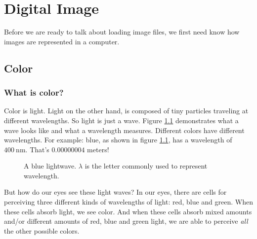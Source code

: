 \begin{comment}
  
\end{comment}

\chapter{Digital Image}
\label{cha:digital-image}

Before we are ready to talk about loading image files, we first need
know how images are represented in a computer.

\section{Color}
\label{sec:color}

\subsection{What is color?}
\label{sec:what-color}

\newcommand{\bluewave}{\ensuremath{\SI{400}{\nano\meter}}}

Color is light. Light on the other hand, is composed of tiny particles
traveling at different wavelengths. \cite{neider93:_openg_progr_guide}
So light is just a wave. Figure \ref{fig:wave} demonstrates what a
wave looks like and what a wavelength measures. Different colors have
different wavelengths. For example: blue, as shown in figure
\ref{fig:wave}, has a wavelength of
\bluewave. \cite{ohlsson99:_digit_bild_kreat} That's $0.00000004$
meters!

\begin{figure}[h!]
  \centering
  \caption{A blue lightwave. $\lambda$ is the letter commonly used to
    represent  wavelength.}
  \label{fig:wave}
\end{figure}

But how do our eyes see these light waves? In our eyes, there are
cells for perceiving three different kinds of wavelengths of light:
red, blue and green. When these cells absorb light, we see color. And
when these cells absorb mixed amounts and/or different amounts of red,
blue and green light, we are able to perceive \textit{all} the other
possible colors.


